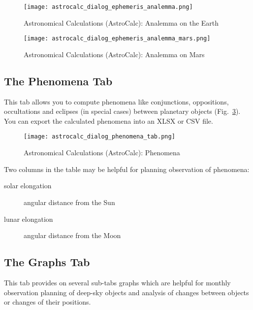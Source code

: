 \begin{figure}[tbp]
\centering\texttt{[image: astrocalc\_dialog\_ephemeris\_analemma.png]}
\caption{Astronomical Calculations (AstroCalc): Analemma on the Earth}
\label{fig:gui:AstroCalc:Ephemeris:Analemma}
\end{figure}

\begin{figure}[tbp]
\centering\texttt{[image: astrocalc\_dialog\_ephemeris\_analemma\_mars.png]}
\caption{Astronomical Calculations (AstroCalc): Analemma on Mars}
\label{fig:gui:AstroCalc:Ephemeris:AnalemmaMars}
\end{figure}

\newpage
\subsection{The Phenomena Tab}
\label{sec:gui:AstroCalc:Phenomena}

This tab allows you to compute phenomena like conjunctions, oppositions, 
occultations and eclipses (in special cases) between planetary objects 
(Fig.~\ref{fig:gui:AstroCalc:Phenomena}). 
You can export the calculated phenomena into an XLSX or CSV file.

\begin{figure}[htbp]
\centering\texttt{[image: astrocalc\_dialog\_phenomena\_tab.png]}
\caption{Astronomical Calculations (AstroCalc): Phenomena}
\label{fig:gui:AstroCalc:Phenomena}
\end{figure}

Two columns in the table  may be helpful for planning observation of phenomena:
\begin{description}
  \item[solar elongation] angular distance from the Sun
  \item[lunar elongation] angular distance from the Moon
\end{description}


\subsection{The Graphs Tab}
\label{sec:gui:AstroCalc:Graphs}

This tab provides on several sub-tabs
 graphs which are helpful for monthly observation
planning of deep-sky objects and analysis of changes between objects
or changes of their positions.

